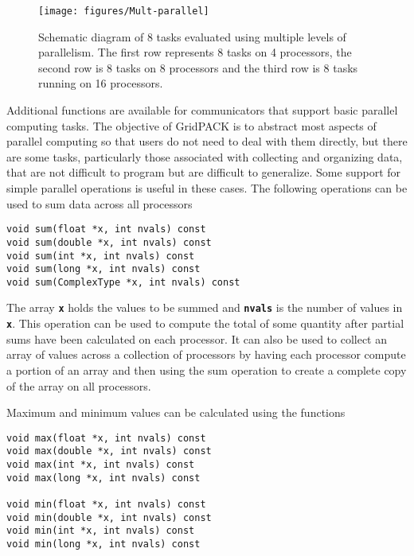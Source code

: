 \begin{figure}
  \centering
    \texttt{[image: figures/Mult-parallel]}
  \caption{ Schematic diagram of 8 tasks evaluated using multiple levels of parallelism. The first row represents 8 tasks on 4 processors, the second row is 8 tasks on 8 processors and the third row is 8 tasks running on 16 processors.}
  \label{fig:multi-level}
\end{figure}



Additional functions are available for communicators that support basic parallel computing tasks. The objective of GridPACK is to abstract most aspects of parallel computing so that users do not need to deal with them directly, but there are some tasks, particularly those associated with collecting and organizing data, that are not difficult to program but are difficult to generalize. Some support for simple parallel operations is useful in these cases. The following operations can be used to sum data across all processors

{
\color{red}
\begin{Verbatim}[fontseries=b]
void sum(float *x, int nvals) const
void sum(double *x, int nvals) const
void sum(int *x, int nvals) const
void sum(long *x, int nvals) const
void sum(ComplexType *x, int nvals) const
\end{Verbatim}
}

The array \texttt{\textbf{x}} holds the values to be summed and \texttt{\textbf{nvals}} is the number of values in \texttt{\textbf{x}}. This operation can be used to compute the total of some quantity after partial sums have been calculated on each processor. It can also be used to collect an array of values across a collection of processors by having each processor compute a portion of an array and then using the sum operation to create a complete copy of the array on all processors.

Maximum and minimum values can be calculated using the functions

{
\color{red}
\begin{Verbatim}[fontseries=b]
void max(float *x, int nvals) const
void max(double *x, int nvals) const
void max(int *x, int nvals) const
void max(long *x, int nvals) const

void min(float *x, int nvals) const
void min(double *x, int nvals) const
void min(int *x, int nvals) const
void min(long *x, int nvals) const
\end{Verbatim}
}

